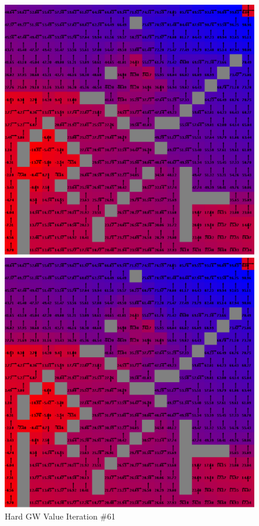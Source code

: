 \documentclass[h]{article}
\begin{document}
  \begin{figure}[H]
      \includegraphics[width=1\textwidth,keepaspectratio]{hard-value-61.png} 
      \caption*{Hard GW Value Iteration \#61} 
   \endminipage\hfill
      \includegraphics[width=1\textwidth,keepaspectratio]{hard-policy-22.png} 

\end{figure}
\end{document}
